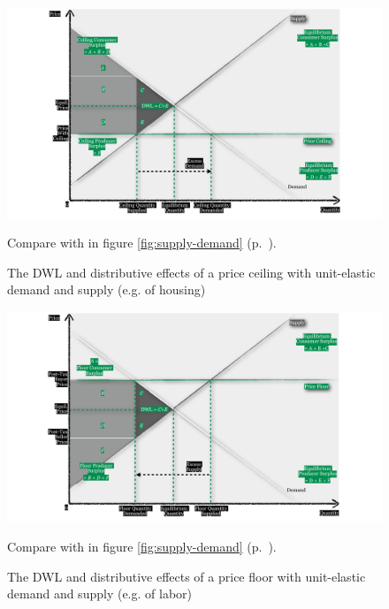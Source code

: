 \begin{figure}[htbp]
	\begin{center}
	\includegraphics[width=1\textwidth]{./img/price-ceiling}  
	\caption[Efficiency and Equity of a Price Ceiling]{The \gls{DWL} and distributive effects of a price ceiling with unit-elastic demand and supply (e.g. of housing)}	
	\end{center}
	\scriptsize{Compare with  in figure \ref{fig:supply-demand} (p.~\pageref{fig:supply-demand}).}
	\label{fig:price-ceiling}
\end{figure}

\begin{figure}[htbp]
	\begin{center}
	\includegraphics[width=1\textwidth]{./img/price-floor}  
	\caption[Efficiency and Equity of a Price Floor]{The \gls{DWL} and distributive effects of a price floor with unit-elastic demand and supply (e.g. of labor)}
	\end{center}
	\scriptsize{Compare with  in figure \ref{fig:supply-demand} (p.~\pageref{fig:supply-demand}).}
	\label{fig:price-floor}
\end{figure}

